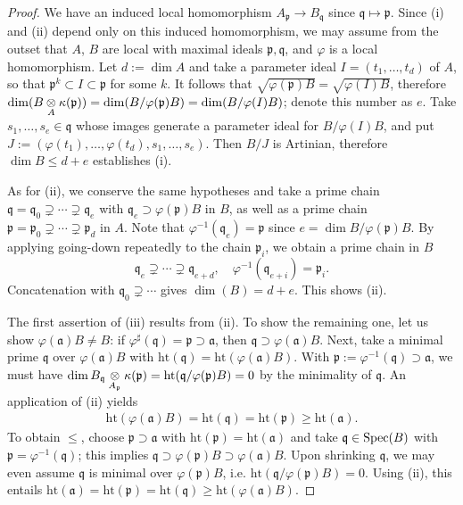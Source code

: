 \begin{proof}
	We have an induced local homomorphism $A_{\mathfrak{p}} \to B_{\mathfrak{q}}$ since $\mathfrak{q} \mapsto \mathfrak{p}$. Since (i) and (ii) depend only on this induced homomorphism, we may assume from the outset that $A$, $B$ are local with maximal ideals $\mathfrak{p}, \mathfrak{q}$, and $\varphi$ is a local homomorphism. Let $d := \dim A$ and take a parameter ideal $I = (t_1, \ldots, t_d)$ of $A$, so that $\mathfrak{p}^k \subset I \subset \mathfrak{p}$ for some $k$. It follows that $\sqrt{\varphi(\mathfrak{p}) B} = \sqrt{\varphi(I)B}$, therefore $\dim(B \underset{A}{\otimes} \kappa(\mathfrak{p})) = \dim(B/\varphi(\mathfrak{p})B) = \dim (B/\varphi(I)B)$; denote this number as $e$. Take $s_1, \ldots, s_e \in \mathfrak{q}$ whose images generate a parameter ideal for $B/\varphi(I)B$, and put $J := (\varphi(t_1), \ldots, \varphi(t_d), s_1, \ldots, s_e)$. Then $B/J$ is Artinian, therefore $\dim B \leq d+e$ establishes (i).
	
	As for (ii), we conserve the same hypotheses and take a prime chain $\mathfrak{q} = \mathfrak{q}_0 \supsetneq \cdots \supsetneq \mathfrak{q}_e$ with $\mathfrak{q}_e \supset \varphi(\mathfrak{p})B$ in $B$, as well as a prime chain $\mathfrak{p} = \mathfrak{p}_0 \supsetneq \cdots \supsetneq \mathfrak{p}_d$ in $A$. Note that $\varphi^{-1}(\mathfrak{q}_e) = \mathfrak{p}$ since $e = \dim B/\varphi(\mathfrak{p})B$. By applying going-down repeatedly to the chain $\mathfrak{p}_i$, we obtain a prime chain in $B$
	\[ \mathfrak{q}_e \supsetneq \cdots \supsetneq \mathfrak{q}_{e+d}, \quad \varphi^{-1}(\mathfrak{q}_{e+i}) = \mathfrak{p}_i. \]
	Concatenation with $\mathfrak{q}_0 \supsetneq \cdots$ gives $\dim(B) = d + e$. This shows (ii).
	
	The first assertion of (iii) results from (ii). To show the remaining one, let us show $\varphi(\mathfrak{a})B \neq B$: if $\varphi^\sharp(\mathfrak{q}) = \mathfrak{p} \supset \mathfrak{a}$, then $\mathfrak{q} \supset \varphi(\mathfrak{a}) B$. Next, take a minimal prime $\mathfrak{q}$ over $\varphi(\mathfrak{a})B$ with $\text{ht}(\mathfrak{q}) = \text{ht}(\varphi(\mathfrak{a})B)$. With $\mathfrak{p} := \varphi^{-1}(\mathfrak{q}) \supset \mathfrak{a}$, we must have $\dim B_{\mathfrak{q}} \underset{A_{\mathfrak{p}}}{\otimes} \kappa(\mathfrak{p}) = \text{ht}(\mathfrak{q}/\varphi(\mathfrak{p})B) = 0$ by the minimality of $\mathfrak{q}$. An application of (ii) yields
	\begin{gather*}
		\text{ht}(\varphi(\mathfrak{a})B) = \text{ht}(\mathfrak{q}) = \text{ht}(\mathfrak{p}) \geq \text{ht}(\mathfrak{a}).
	\end{gather*}
	To obtain $\leq$, choose $\mathfrak{p} \supset \mathfrak{a}$ with $\text{ht}(\mathfrak{p}) = \text{ht}(\mathfrak{a})$ and take $\mathfrak{q} \in \operatorname{Spec}(B)$ with $\mathfrak{p} = \varphi^{-1}(\mathfrak{q})$; this implies $\mathfrak{q} \supset \varphi(\mathfrak{p})B \supset \varphi(\mathfrak{a})B$. Upon shrinking $\mathfrak{q}$, we may even assume $\mathfrak{q}$ is minimal over $\varphi(\mathfrak{p})B$, i.e. $\text{ht}(\mathfrak{q}/ \varphi(\mathfrak{p})B) = 0$. Using (ii), this entails $\text{ht}(\mathfrak{a}) = \text{ht}(\mathfrak{p}) = \text{ht}(\mathfrak{q}) \geq \text{ht}(\varphi(\mathfrak{a})B)$.
\end{proof}

